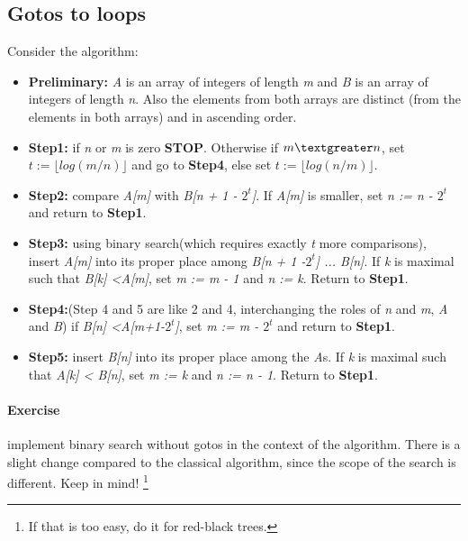 \documentclass{article}
\newcommand{\percents}[1]{\protect \marginpar[l]{\bf [#1]}}
\newcounter{question}
\newcommand{\question}[1]{
  \addtocounter{question}{1}
  \paragraph{Exercise~\arabic{question}  \percents{#1}}
 }
\begin{document}
\subsection{Gotos to loops}

Consider the algorithm:

\begin{itemize}
\item \textbf {Preliminary:} {\it A} is an array of integers of length
  {\it m} and {\it B} is an array of integers of length {\it n}. Also
  the elements from both arrays are distinct (from the elements in
  both arrays) and in ascending order.

\item \textbf{Step1:} if {\it n} or {\it m} is zero
  \textbf{STOP}. Otherwise if  $m\textgreater n$, set $t := \lfloor log
    \left ( m \slash n \right ) \rfloor $  and go to \textbf{Step4},
    else set $t := \lfloor log
    \left ( n \slash m \right ) \rfloor $.

\item \textbf{Step2:} compare {\it A[m]} with {\it B[n + 1 -
    $2^t$]}. If {\it A[m]} is smaller, set {\it n := n - $2^t$} and
  return to \textbf{Step1}.

\item \textbf{Step3:} using binary search(which requires exactly {\it
    t} more comparisons), insert {\it A[m]} into its proper place
  among {\it B[n + 1 -$2^t$] ... B[n]}. If {\it k} is maximal such
  that {\it B[k] \textless A[m]}, set {\it m := m - 1} and {\it n :=
    k}. Return to \textbf{Step1}.

\item \textbf{Step4:}(Step 4 and 5 are like 2 and 4, interchanging the
  roles of {\it n} and {\it m}, {\it A} and {\it B}) if {\it B[n]
    \textless A[m+1-$2^t$]}, set {\it m := m - $2^t$} and return to
  \textbf{Step1}.

\item \textbf{Step5:} insert {\it B[n]} into its proper place among
  the {\it A}s. If {\it k} is maximal such that {\it A[k] \textless
    B[n]}, set {\it m := k} and {\it n := n - 1}. Return to \textbf{Step1}.


\end{itemize}


\question{*}

implement binary search without gotos in the context of the
algorithm. There is a slight change compared to the classical
algorithm, since the scope of the search is different. Keep in mind!
\footnote{If that is too easy, do it for red-black trees.}
\end{document}
